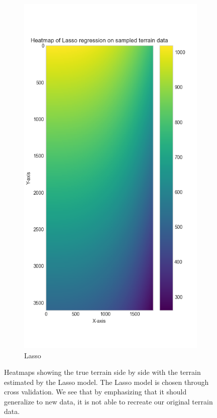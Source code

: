 \begin{figure}[H]
\begin{subfigure}[h]{0.45\textwidth}
     \end{subfigure}
     \hfill
     \begin{subfigure}[h]{0.45\textwidth}
         \centering
         \includegraphics[width=\textwidth]{Images/cv_lasso_terrain_heatmap.png}
         \caption{Lasso}
         \label{fig:Lasso CVHeatmap}
     \end{subfigure}
     
        \caption{Heatmaps showing the true terrain side by side with the terrain estimated by the Lasso model. The Lasso model is chosen through cross validation. We see that by emphasizing that it should generalize to new data, it is not able to recreate our original terrain data.}
        \label{fig:four graphs}
\end{figure}


